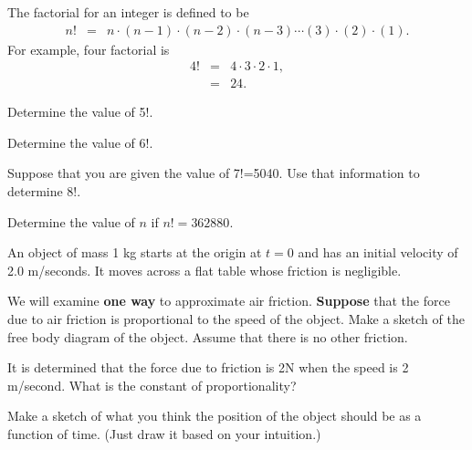 
\begin{problem}
\item The factorial for an integer is defined to be
  \begin{eqnarray*}
    n! & = & n \cdot (n-1) \cdot (n-2) \cdot (n-3) \cdots (3) \cdot (2) \cdot (1).
  \end{eqnarray*}
  For example, four factorial is
  \begin{eqnarray*}
    4! & = & 4 \cdot 3 \cdot 2 \cdot 1, \\
       & = & 24.
  \end{eqnarray*}

  \begin{subproblem}
  \item Determine the value of 5!.
    \vfill
  \item Determine the value of 6!.
    \vfill
  \item Suppose that you are given the value of 7!=5040. Use that
    information to determine 8!.
    \vfill
  \item Determine the value of $n$ if $n!=362880$.
    \vfill
  \end{subproblem}

\clearpage

\item An object of mass 1 kg starts at the origin at $t=0$ and has an
  initial velocity of 2.0 m/seconds. It moves across a flat table
  whose friction is negligible.
  \begin{subproblem}
  \item We will examine \textbf{one way} to approximate air friction.
    \textbf{Suppose} that the force due to air friction is
    proportional to the speed of the object.  Make a sketch of the
    free body diagram of the object. Assume that there is no other
    friction.  

    \vfill

  \item It is determined that the force due to friction is 2N when the
    speed is 2 m/second. What is the constant of proportionality?

    \vspace{4em}

  \item Make a sketch of what you think the position of the object
    should be as a function of time. (Just draw it based on
    your intuition.)

    \vfill
  \end{subproblem}

\end{problem}


